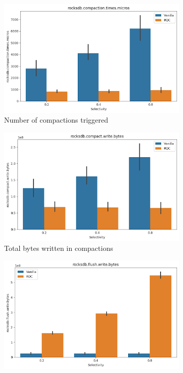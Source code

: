 \begin{figure}
    \begin{subfigure}{0.33\textwidth}
        \centering
        \includegraphics[width=\linewidth]{Figures/Compaction Times.png}
        \caption{Number of compactions triggered}\label{fig:compaction_times}
    \end{subfigure}%
    \begin{subfigure}{0.33\textwidth}
        \centering
        \includegraphics[width=\linewidth]{Figures/Compaction Write Bytes.png}
        \caption{Total bytes written in compactions}\label{fig:compaction_write_bytes}
    \end{subfigure}%
    \begin{subfigure}{0.33\textwidth}
        \centering
        \includegraphics[width=\linewidth]{Figures/Range Query Flush Write Bytes.png}

\end{subfigure}
\end{figure}
